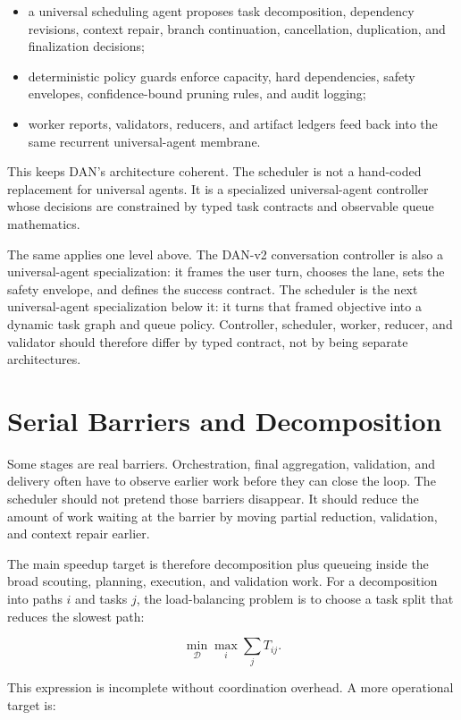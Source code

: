 \documentclass[11pt]{article}
\begin{document}
\begin{itemize}[leftmargin=1.5em]
\item a universal scheduling agent proposes task decomposition, dependency revisions, context repair, branch continuation, cancellation, duplication, and finalization decisions;
\item deterministic policy guards enforce capacity, hard dependencies, safety envelopes, confidence-bound pruning rules, and audit logging;
\item worker reports, validators, reducers, and artifact ledgers feed back into the same recurrent universal-agent membrane.
\end{itemize}

This keeps DAN's architecture coherent. The scheduler is not a hand-coded replacement for universal agents. It is a specialized universal-agent controller whose decisions are constrained by typed task contracts and observable queue mathematics.

The same applies one level above. The DAN-v2 conversation controller is also a universal-agent specialization: it frames the user turn, chooses the lane, sets the safety envelope, and defines the success contract. The scheduler is the next universal-agent specialization below it: it turns that framed objective into a dynamic task graph and queue policy. Controller, scheduler, worker, reducer, and validator should therefore differ by typed contract, not by being separate architectures.

\section{Serial Barriers and Decomposition}

Some stages are real barriers. Orchestration, final aggregation, validation, and delivery often have to observe earlier work before they can close the loop. The scheduler should not pretend those barriers disappear. It should reduce the amount of work waiting at the barrier by moving partial reduction, validation, and context repair earlier.

The main speedup target is therefore decomposition plus queueing inside the broad scouting, planning, execution, and validation work. For a decomposition into paths $i$ and tasks $j$, the load-balancing problem is to choose a task split that reduces the slowest path:

\[
\min_{\mathcal{D}} \max_i \sum_j T_{ij}.
\]

This expression is incomplete without coordination overhead. A more operational target is:
\end{document}
